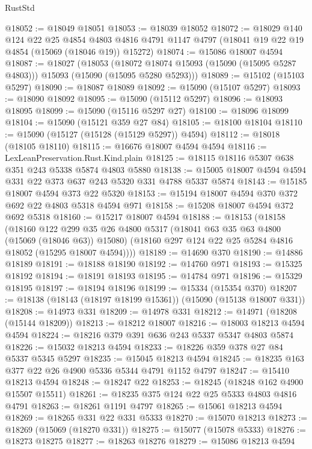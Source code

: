\begin{lexlean}{RustStd}
\begin{coremodule}
@18052 := @18049 @18051
@18053 := @18039 @18052
@18072 := @18029
    @140
    @124
    @22
    @25
    @4854
    @4803
    @4816
    @4791
    @1147
    @4797
    (@18041 @19 @22 @19 @4854 (@15069 (@18046 @19)) @15272)
@18074 := @15086 @18007 @4594
@18087 := @18027
    (@18053
      (@18072 @18074 @15093 (@15090 (@15095 @5287 @4803)))
      @15093
      (@15090 (@15095 @5280 @5293)))
@18089 := @15102 (@15103 @5297)
@18090 := @18087 @18089
@18092 := @15090 (@15107 @5297)
@18093 := @18090 @18092
@18095 := @15090 (@15112 @5297)
@18096 := @18093 @18095
@18099 := @15090 (@15116 @5297 @27)
@18100 := @18096 @18099
@18104 := @15090 (@15121 @359 @27 @84)
@18105 := @18100 @18104
@18110 := @15090 (@15127 (@15128 (@15129 @5297)) @4594)
@18112 := @18018 (@18105 @18110)
@18115 := @16676 @18007 @4594 @4594
@18116 := LexLeanPreservation.Rust.Kind.plain
@18125 := @18115 @18116 @5307 @638 @351 @243 @5338 @5874 @4803 @5880
@18138 := @15005 @18007 @4594 @4594 @331 @22 @373 @637 @243 @5320 @331 @4788 @5337 @5874
@18143 := @15185 @18007 @4594 @373 @22 @5320
@18153 := @15194 @18007 @4594 @370 @372 @692 @22 @4803 @5318 @4594 @971
@18158 := @15208 @18007 @4594 @372 @692 @5318
@18160 := @15217 @18007 @4594
@18188 := @18153
    (@18158
      (@18160
        @122
        @299
        @35
        @26
        @4800
        @5317
        (@18041 @63 @35 @63 @4800 (@15069 (@18046 @63)) @15080)
        (@18160 @297 @124 @22 @25 @5284 @4816 @18052 (@15295 @18007 @4594))))
@18189 := @14690 @370
@18190 := @14886 @18189
@18191 := @18188 @18190
@18192 := @14760 @971
@18193 := @15325 @18192
@18194 := @18191 @18193
@18195 := @14784 @971
@18196 := @15329 @18195
@18197 := @18194 @18196
@18199 := @15334 (@15354 @370)
@18207 := @18138 (@18143 (@18197 @18199 @15361)) (@15090 (@15138 @18007 @331))
@18208 := @14973 @331
@18209 := @14978 @331
@18212 := @14971 (@18208 (@15144 @18209))
@18213 := @18212 @18007
@18216 := @18003 @18213 @4594 @4594
@18224 := @18216 @379 @391 @636 @243 @5337 @5347 @4803 @5874
@18226 := @15032 @18213 @4594
@18233 := @18226 @359 @378 @27 @84 @5337 @5345 @5297
@18235 := @15045 @18213 @4594
@18245 := @18235 @163 @377 @22 @26 @4900 @5336 @5344 @4791 @1152 @4797
@18247 := @15410 @18213 @4594
@18248 := @18247 @22
@18253 := @18245 (@18248 @162 @4900 @15507 @15511)
@18261 := @18235 @375 @124 @22 @25 @5333 @4803 @4816 @4791
@18263 := @18261 @1191 @4797
@18265 := @15061 @18213 @4594
@18269 := @18265 @331 @22 @331 @5333
@18270 := @15070 @18213
@18273 := @18269 (@15069 (@18270 @331))
@18275 := @15077 (@15078 @5333)
@18276 := @18273 @18275
@18277 := @18263 @18276
@18279 := @15086 @18213 @4594

\end{coremodule}
\end{lexlean}

